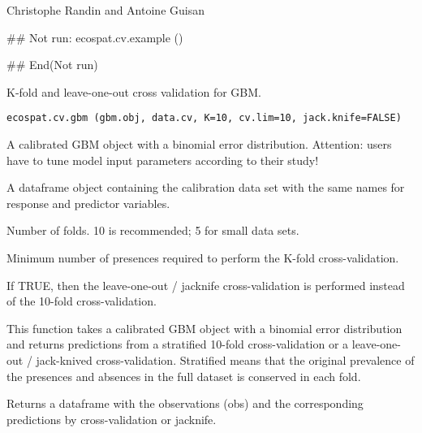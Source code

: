 \documentclass[a4paper]{book}
\begin{document}
%
\begin{Author}\relax
Christophe Randin  and Antoine Guisan 
\end{Author}
%
\begin{Examples}
\begin{ExampleCode}
## Not run:  
ecospat.cv.example ()

## End(Not run)
\end{ExampleCode}
\end{Examples}
%
\begin{Description}\relax
K-fold and leave-one-out cross validation for GBM.
\end{Description}
%
\begin{Usage}
\begin{verbatim}
ecospat.cv.gbm (gbm.obj, data.cv, K=10, cv.lim=10, jack.knife=FALSE)
\end{verbatim}
\end{Usage}
%
\begin{Arguments}
\begin{ldescription}
\item[\code{gbm.obj}] A calibrated GBM object with a binomial error distribution. Attention: users have to tune model input parameters according to their study!
\item[\code{data.cv}] A dataframe object containing the calibration data set with the same names for response and predictor variables.
\item[\code{K}] Number of folds. 10 is recommended; 5 for small data sets.
\item[\code{cv.lim}] Minimum number of presences required to perform the K-fold cross-validation.
\item[\code{jack.knife}] If TRUE, then the leave-one-out / jacknife cross-validation is performed instead of the 10-fold cross-validation.
\end{ldescription}
\end{Arguments}
%
\begin{Details}\relax
This function takes a calibrated GBM object with a binomial error distribution and returns predictions from a stratified 10-fold cross-validation or a leave-one-out / jack-knived cross-validation. Stratified means that the original prevalence of the presences and absences in the full dataset is conserved in each fold.
\end{Details}
%
\begin{Value}
Returns a dataframe with the observations (obs) and the corresponding predictions by cross-validation or jacknife.
\end{Value}
\end{document}
